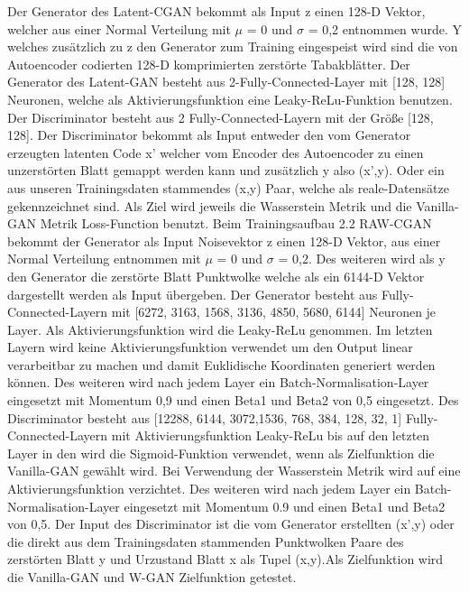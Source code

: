 \documentclass{llncs}
\begin{document}
Der Generator des Latent-CGAN bekommt als Input z einen 128-D Vektor, welcher aus einer Normal Verteilung mit $\mu$ = 0 und $\sigma$ =  0,2 entnommen wurde. Y welches zusätzlich zu z den Generator zum Training eingespeist wird sind die von Autoencoder codierten 128-D komprimierten zerstörte Tabakblätter. Der Generator des Latent-GAN besteht aus 2-Fully-Connected-Layer mit [128, 128] Neuronen, welche als Aktivierungsfunktion eine Leaky-ReLu-Funktion benutzen. Der Discriminator besteht aus 2 Fully-Connected-Layern mit der Größe [128, 128]. Der Discriminator bekommt als Input entweder den vom Generator erzeugten latenten Code x' welcher vom Encoder des Autoencoder zu einen unzerstörten Blatt gemappt werden kann und zusätzlich y also (x',y). Oder ein aus unseren Trainingsdaten stammendes (x,y) Paar, welche als reale-Datensätze gekennzeichnet sind. Als Ziel wird jeweils die Wasserstein Metrik und die Vanilla-GAN Metrik Loss-Function benutzt. Beim Trainingsaufbau 2.2 RAW-CGAN bekommt der Generator als Input Noisevektor z einen 128-D Vektor, aus einer  Normal Verteilung entnommen mit $\mu$ =  0 und $\sigma$ =  0,2. Des weiteren wird als y den Generator die zerstörte Blatt Punktwolke welche als ein 6144-D Vektor dargestellt werden als Input übergeben. Der Generator besteht aus Fully-Connected-Layern mit [6272, 3163, 1568, 3136, 4850, 5680, 6144] Neuronen je Layer. Als Aktivierungsfunktion wird die Leaky-ReLu genommen. Im letzten Layern wird keine Aktivierungsfunktion verwendet um den Output linear verarbeitbar zu machen und damit Euklidische Koordinaten generiert werden können. Des weiteren wird nach jedem Layer ein Batch-Normalisation-Layer eingesetzt mit Momentum 0,9 und einen Beta1 und Beta2 von 0,5 eingesetzt. Des Discriminator besteht aus [12288, 6144, 3072,1536, 768, 384, 128, 32, 1] Fully-Connected-Layern mit Aktivierungsfunktion Leaky-ReLu bis auf den letzten Layer in den wird die Sigmoid-Funktion verwendet, wenn als Zielfunktion die Vanilla-GAN gewählt wird. Bei Verwendung der Wasserstein Metrik wird auf eine Aktivierungsfunktion verzichtet. Des weiteren wird nach jedem Layer ein Batch-Normalisation-Layer eingesetzt mit Momentum 0.9 und einen Beta1 und Beta2 von 0,5. Der Input des Discriminator ist die vom Generator erstellten (x',y) oder die direkt aus dem Trainingsdaten stammenden Punktwolken Paare des zerstörten Blatt y und Urzustand Blatt x als Tupel (x,y).Als Zielfunktion wird die Vanilla-GAN und W-GAN Zielfunktion getestet.
\\\\
\end{document}
